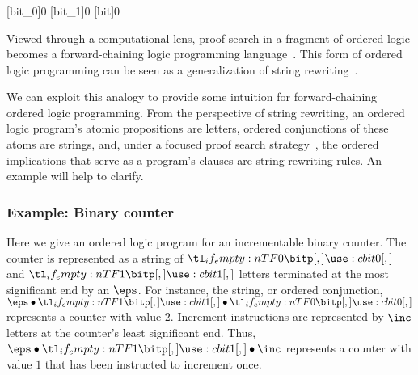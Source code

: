 \subsubsection{}\label{sec:xyz}

%
%
\expandafter\NewPredicate\expandafter{\csname bit0\endcsname}[bit_0]{0}%
\expandafter\NewPredicate\expandafter{\csname bit1\endcsname}[bit_1]{0}%
\NewPredicate{\bitp}[bit]{0}%
\ExplSyntaxOn
{}
\ExplSyntaxOff
{}%
%

Viewed through a computational lens, proof search in a fragment of ordered logic becomes a forward-chaining logic programming language~\autocite{Pfenning+Simmons:LICS09}.
This form of ordered logic programming can be seen as a generalization of string rewriting~\autocite[see, \eg,][]{Book+Otto:SRS93}.

We can exploit this analogy to provide some intuition for forward-chaining ordered logic programming.
From the perspective of string rewriting, an ordered logic program's atomic propositions are letters, ordered conjunctions of these atoms are strings, and, under a focused proof search strategy~\autocite{Andreoli:JLC92}, the ordered implications that serve as a program's clauses are string rewriting rules.
An example will help to clarify.

\subsubsection{Example: Binary counter}\label{sec:exampl-binary-count-5}

Here we give an ordered logic program for an incrementable binary counter.
% 
The counter is represented as a string of $\bit{0}$ and $\bit{1}$ letters terminated at the most significant end by an $\eps$.
For instance, the string, or ordered conjunction, $\eps \fuse \bit{1} \fuse \bit{0}$ represents a counter with value $2$.
%
Increment instructions are represented by $\inc$ letters at the counter's least significant end. 
Thus, $\eps \fuse \bit{1} \fuse \inc$ represents a counter with value $1$ that has been instructed to increment once.

